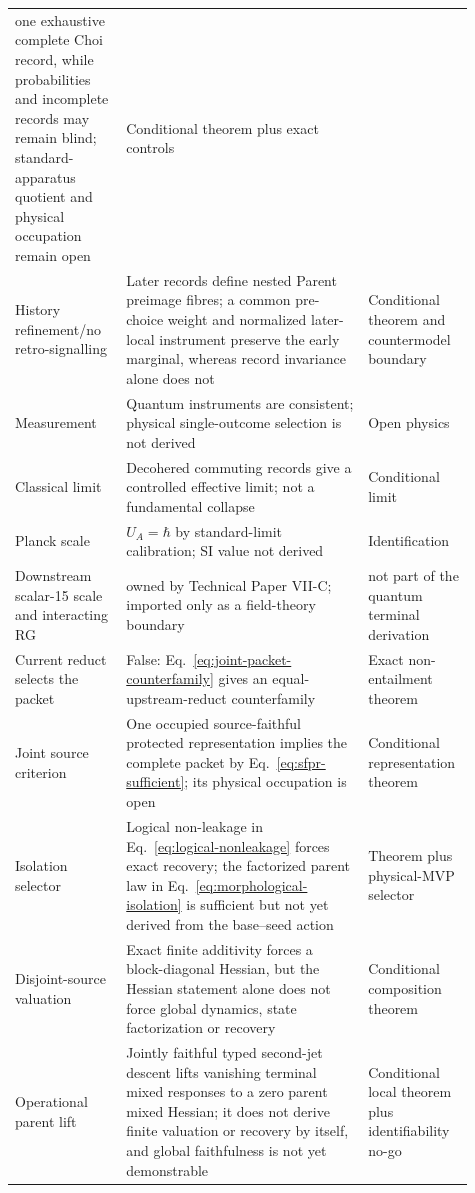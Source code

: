 \documentclass[11pt]{article}
\begin{document}
\begin{longtable}{@{}>{\raggedright\arraybackslash}p{0.23\linewidth}>{\raggedright\arraybackslash}p{0.50\linewidth}>{\raggedright\arraybackslash}p{0.18\linewidth}@{}}
one exhaustive complete Choi record, while probabilities and incomplete
records may remain blind; standard-apparatus quotient and physical occupation
remain open & Conditional theorem plus exact controls \\
History refinement/no retro-signalling & Later records define nested Parent
preimage fibres; a common pre-choice weight and normalized later-local
instrument preserve the early marginal, whereas record invariance alone does
not & Conditional theorem and countermodel boundary \\
Measurement & Quantum instruments are consistent; physical single-outcome
selection is not derived & Open physics \\
Classical limit & Decohered commuting records give a controlled effective
limit; not a fundamental collapse & Conditional limit \\
Planck scale & $U_A=\hbar$ by standard-limit calibration; SI value not derived
& Identification \\
Downstream scalar-15 scale and interacting RG & owned by Technical Paper
VII-C; imported only as a field-theory boundary & not part of the quantum
terminal derivation \\
Current reduct selects the packet & False:
Eq.~\eqref{eq:joint-packet-counterfamily} gives an equal-upstream-reduct
counterfamily & Exact non-entailment theorem \\
Joint source criterion & One occupied source-faithful protected
representation implies the complete packet by Eq.~\eqref{eq:sfpr-sufficient};
its physical occupation is open & Conditional representation theorem \\
Isolation selector & Logical non-leakage in
Eq.~\eqref{eq:logical-nonleakage} forces exact recovery; the factorized parent
law in Eq.~\eqref{eq:morphological-isolation} is sufficient but not yet
derived from the base--seed action & Theorem plus physical-MVP selector \\
Disjoint-source valuation & Exact finite additivity forces a block-diagonal
Hessian, but the Hessian statement alone does not force global dynamics,
state factorization or recovery & Conditional composition theorem \\
Operational parent lift & Jointly faithful typed second-jet descent lifts
vanishing terminal mixed responses to a zero parent mixed Hessian; it does not
derive finite valuation or recovery by itself, and global faithfulness is not
yet demonstrable & Conditional local theorem plus identifiability no-go \\

\end{longtable}
\end{document}
